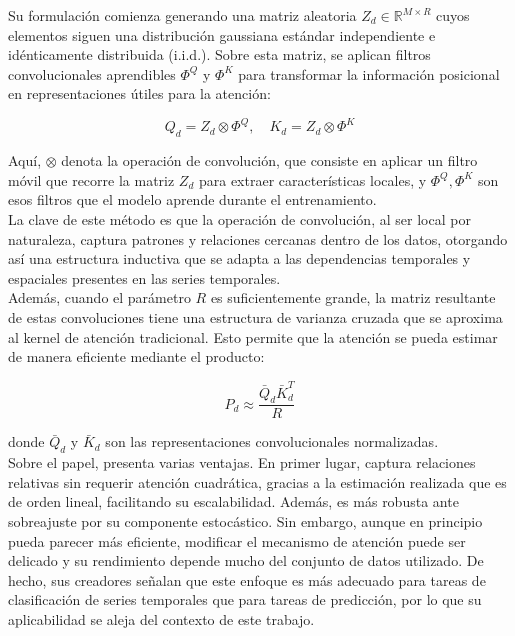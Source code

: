 Su formulación comienza generando una matriz aleatoria \( Z_d \in \mathbb{R}^{M \times R} \) cuyos elementos siguen una distribución gaussiana estándar independiente e idénticamente distribuida (i.i.d.). Sobre esta matriz, se aplican filtros convolucionales aprendibles \(\Phi^Q\) y \(\Phi^K\) para transformar la información posicional en representaciones útiles para la atención:

\begin{equation}
Q_d = Z_d \otimes \Phi^Q, \quad K_d = Z_d \otimes \Phi^K
\end{equation}

Aquí, \(\otimes\) denota la operación de convolución, que consiste en aplicar un filtro móvil que recorre la matriz \(Z_d\) para extraer características locales, y \(\Phi^Q, \Phi^K\) son esos filtros que el modelo aprende durante el entrenamiento.\\

La clave de este método es que la operación de convolución, al ser local por naturaleza, captura patrones y relaciones cercanas dentro de los datos, otorgando así una estructura inductiva que se adapta a las dependencias temporales y espaciales presentes en las series temporales.\\

Además, cuando el parámetro \(R\) es suficientemente grande, la matriz resultante de estas convoluciones tiene una estructura de varianza cruzada que se aproxima al kernel de atención tradicional. Esto permite que la atención se pueda estimar de manera eficiente mediante el producto:

\begin{equation}
	P_d \approx \frac{\bar{Q}_d \bar{K}_d^T}{R}
\end{equation}

donde \(\bar{Q}_d\) y \(\bar{K}_d\) son las representaciones convolucionales normalizadas.\\

Sobre el papel, presenta varias ventajas. En primer lugar, captura relaciones relativas sin requerir atención cuadrática, gracias a la estimación realizada que es de orden lineal, facilitando su escalabilidad. Además, es más robusta ante sobreajuste por su componente estocástico. Sin embargo, aunque en principio pueda parecer más eficiente, modificar el mecanismo de atención puede ser delicado y su rendimiento depende mucho del conjunto de datos utilizado. De hecho, sus creadores señalan que este enfoque es más adecuado para tareas de clasificación de series temporales que para tareas de predicción, por lo que su aplicabilidad se aleja del contexto de este trabajo.


